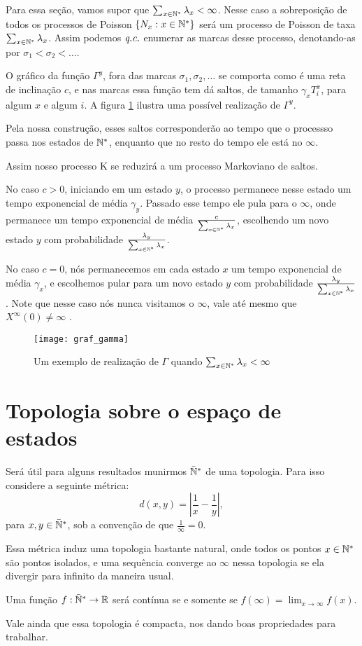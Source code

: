 Para essa seção, vamos supor que $\sum_{x \in {\mathbb{N^*}}} \lambda_x <
\infty$. Nesse caso a sobreposição de todos os processos de Poisson
$\{N_x : x \in {\mathbb{N^*}}\}$ será um processo de Poisson de taxa $\sum_{x \in
  {\mathbb{N^*}}} \lambda_x$. Assim podemos ${\emph{q.c.}}$ enumerar as marcas desse
processo, denotando-as por $ \sigma_1 < \sigma_2 < \ldots$.

O gráfico da função $\Gamma^y$, fora das marcas $\sigma_1, \sigma_2,
\ldots$ se comporta como é uma reta de inclinação $c$, e nas marcas
essa função tem dá saltos, de tamanho $\gamma_x T^x_i$, para algum $x$
e algum $i$. A figura \ref{fig:graf_gamma} ilustra uma possível
realização de $\Gamma^y$.


Pela nossa construção, esses saltos corresponderão ao tempo que o
processso passa nos estados de ${\mathbb{N^*}}$, enquanto que no resto do tempo
ele está no $\infty$.

Assim nosso processo K se reduzirá a um processo Markoviano de
saltos.

No caso $c > 0$, iniciando em um estado $y$, o processo permanece
nesse estado um tempo exponencial de média $\gamma_y$. Passado esse
tempo ele pula para o $\infty$, onde permanece um tempo exponencial de
média $\frac{c}{\sum_{x \in {\mathbb{N^*}}} \lambda_x}$, escolhendo um novo
estado $y$ com probabilidade $\frac{\lambda_y}{\sum_{x \in {\mathbb{N^*}}}
  \lambda_x}$.

No caso $c=0$, nós permanecemos em cada estado $x$ um tempo
exponencial de média $\gamma_x$, e escolhemos pular para um novo estado $y$
com probabilidade $\frac{\lambda_y}{\sum_{x \in {\mathbb{N^*}}} \lambda_x}$.
Note que nesse caso nós nunca visitamos o $\infty$, vale até mesmo que
$X^\infty(0) \neq \infty$ \qc.


\begin{figure}
  \centering
  \texttt{[image: graf\_gamma]}
  \caption{Um exemplo de realização de $\Gamma$ quando $\sum_{x \in
      {\mathbb{N^*}}} \lambda_x < \infty$}
  \label{fig:graf_gamma}
\end{figure}

\section{Topologia sobre o espaço de estados}
\label{sec:topologia}

Será útil para alguns resultados munirmos ${\mathbb{\bar{N}^*}}$ de uma
topologia. Para isso considere a seguinte métrica:
\begin{equation}
  \label{eq:metrica}
  d(x, y) = \left\lvert \frac{1}{x} - \frac{1}{y} \right\rvert,
\end{equation}
para $x, y \in {\mathbb{\bar{N}^*}}$, sob a convenção de que $\frac{1}{\infty} = 0$.

Essa métrica induz uma topologia bastante natural, onde todos os
pontos $x \in {\mathbb{N^*}}$ são pontos isolados, e uma sequência converge ao
$\infty$ nessa topologia se ela divergir para infinito da maneira
usual.

Uma função $f: {\mathbb{\bar{N}^*}} \to {\mathbb{R}}$ será contínua se e somente se
$f(\infty) = \lim_{x \to \infty} f(x)$.

Vale ainda que essa topologia é compacta, nos dando boas propriedades
para trabalhar.

